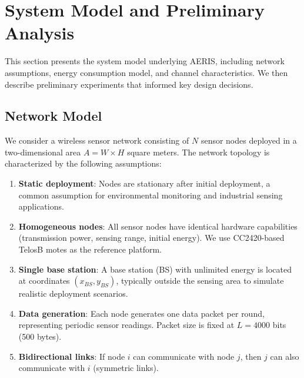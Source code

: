 
\section{System Model and Preliminary Analysis}
\label{sec:system}

This section presents the system model underlying AERIS, including network
assumptions, energy consumption model, and channel characteristics. We then
describe preliminary experiments that informed key design decisions.

\subsection{Network Model}

We consider a wireless sensor network consisting of $N$ sensor nodes
deployed in a two-dimensional area $A = W \times H$ square meters. The
network topology is characterized by the following assumptions:

\begin{enumerate}
    \item \textbf{Static deployment}: Nodes are stationary after initial
    deployment, a common assumption for environmental monitoring and
    industrial sensing applications.

    \item \textbf{Homogeneous nodes}: All sensor nodes have identical
    hardware capabilities (transmission power, sensing range, initial
    energy). We use CC2420-based TelosB motes as the reference platform.

    \item \textbf{Single base station}: A base station (BS) with unlimited
    energy is located at coordinates $(x_{BS}, y_{BS})$, typically outside
    the sensing area to simulate realistic deployment scenarios.

    \item \textbf{Data generation}: Each node generates one data packet
    per round, representing periodic sensor readings. Packet size is
    fixed at $L = 4000$ bits (500 bytes).

    \item \textbf{Bidirectional links}: If node $i$ can communicate with
    node $j$, then $j$ can also communicate with $i$ (symmetric links).
\end{enumerate}

